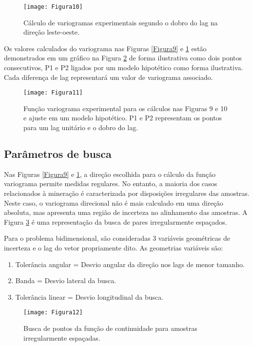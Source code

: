 \begin{figure}[H]
	\centering
	\texttt{[image: Figura10]}
	\caption{Cálculo de variogramas experimentais segundo o dobro do lag na direção leste-oeste.}
	\label{Figura10}
\end{figure}

Os valores calculados do variograma nas  Figuras \ref{Figura9} e \ref{Figura10} estão demonstrados em um gráfico na Figura \ref{Figura11} de forma ilustrativa como dois pontos consecutivos, P1 e P2 ligados por um modelo hipotético como forma ilustrativa. Cada diferença de lag representará um valor de variograma associado. 

\begin{figure}[H]
	\centering
	\texttt{[image: Figura11]}
	\caption{Função variograma experimental para os cálculos nas Figuras 9 e 10 e ajuste em um modelo hipotético. P1 e P2 representam os pontos para um lag unitário e o dobro do lag.}
	\label{Figura11}
\end{figure}

\subsection{Parâmetros de busca}

Nas Figuras \ref{Figura9} e \ref{Figura10}, a direção escolhida para o cálculo da função variograma permite medidas regulares. No entanto, a maioria dos casos relacionados à mineração é caracterizada por disposições irregulares das amostras. Neste caso, o variograma direcional não é mais calculado em uma direção absoluta, mas apresenta uma região de incerteza no alinhamento das amostras. A Figura \ref{Figura12} é uma representação da busca de pares irregularmente espaçados.

Para o problema bidimensional, são consideradas 3 variáveis geométricas de incerteza e o lag do vetor propriamente dito. As geometrias variáveis são:

\begin{enumerate}
	\item 	Tolerância angular = Desvio angular da direção nos lags de menor tamanho.
	\item 	Banda = Desvio lateral da busca. 
	\item	Tolerância linear = Desvio longitudinal da busca.
	
\end{enumerate}

\begin{figure}[H]
	\centering
	\texttt{[image: Figura12]}
	\caption{Busca de pontos da função de continuidade para amostras irregularmente espaçadas.}
	\label{Figura12}
\end{figure}

